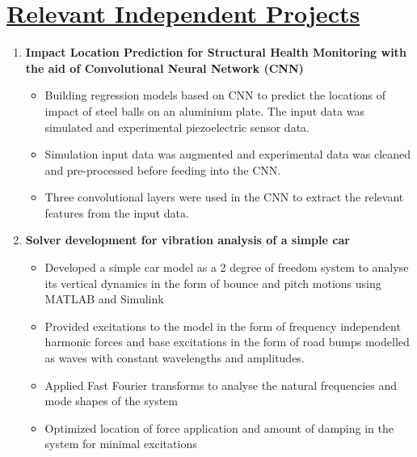 \section{\underline{Relevant Independent Projects}}
\begin{enumerate}
\item\large{\textbf{Impact Location Prediction for Structural Health Monitoring with the aid of Convolutional Neural Network (CNN)}}
\begin{itemize}
\item\large{Building regression models based on CNN to predict the locations of impact of steel balls on an aluminium plate. The input data was simulated and experimental piezoelectric sensor data.}
\item\large{Simulation input data was augmented and experimental data was cleaned and pre-processed before feeding into the CNN.}
\item\large{Three convolutional layers were used in the CNN to extract the relevant features from the input data.}
\end{itemize}
\item\large\textbf{{Solver development for vibration analysis of a simple car}}
\begin{itemize}
\item\large{Developed a simple car model as a 2 degree of freedom system to analyse its vertical dynamics in the form of bounce and pitch motions using MATLAB and Simulink}
\item\large{Provided excitations to the model in the form of frequency independent harmonic forces and base excitations in the form of road bumps modelled as waves with constant wavelengths and amplitudes.}
\item\large{Applied Fast Fourier transforms to analyse the natural frequencies and mode shapes of the system}
\item\large{Optimized location of force application and amount of damping in the system for minimal excitations}
\end{itemize}
\end{enumerate}